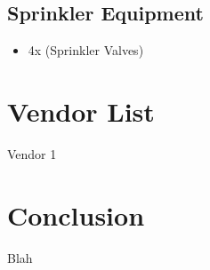 \documentclass[letterpaper, 10 pt, conference]{ieeeconf}  %
\begin{document}
\subsection{Sprinkler Equipment}
\begin{itemize}
  \item 4x (Sprinkler Valves)
\end{itemize}

\section{Vendor List}
Vendor 1

\section{Conclusion}
Blah




\end{document}
